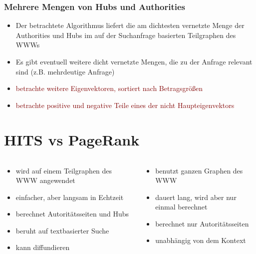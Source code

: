 \documentclass[hyperref={pdfpagelabels=false}]{beamer}
\begin{document}
\begin{frame}
\frametitle{Mehrere Mengen von Hubs und Authorities}
\begin{itemize}
\item Der betrachtete Algorithmus liefert die am dichtesten vernetzte Menge der Authorities und Hubs im auf der Suchanfrage basierten Teilgraphen des WWWs\\
\item Es gibt eventuell weitere dicht vernetzte Mengen, die zu der Anfrage relevant sind (z.B. mehrdeutige Anfrage)
\item \textcolor{maroon}{betrachte weitere Eigenvektoren, sortiert nach Betragsgrößen}
\item
\textcolor{maroon}{betrachte positive und negative Teile eines der nicht Haupteigenvektors}
\end{itemize}

\end{frame}

\section{HITS vs PageRank}
\begin{frame}

\begin{minipage}[0.2\textheight]{\textwidth}
	\begin{columns}[T]
		\begin{column}{0.5\textwidth}
		\begin{itemize}
			\item wird auf einem Teilgraphen des WWW angewendet
			\item einfacher, aber langsam in Echtzeit
			\item berechnet Autoritätsseiten und Hubs
			\item beruht auf textbasierter Suche
			\item kann \glqq diffundieren\grqq
		\end{itemize}
		\end{column}
		
		\begin{column}{0.5\textwidth}
		\begin{itemize}
			\item benutzt ganzen Graphen des WWW
			\item dauert lang, wird aber nur einmal berechnet
			\item berechnet nur Autoritätsseiten
			\item unabhängig von dem Kontext
		\end{itemize}
		\end{column}
	\end{columns}
\end{minipage}


\end{frame}
\end{document}
